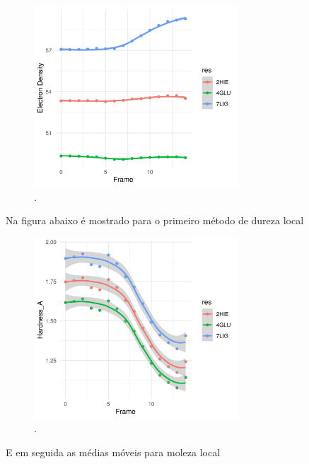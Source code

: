 \documentclass[a4paper,11pt]{refart}
\begin{document}
\hspace*{-\leftmarginwidth}
\begin{minipage}{\fullwidth}
	\begin{figure}[H]
		\begin{center}
			\includegraphics[width=3in]{images/tut6_img14}
			\caption{.}
			\label{fig_tut6_13}
		\end{center}
	\end{figure}
\end{minipage}

Na figura abaixo é mostrado para o primeiro método de dureza local 

\hspace*{-\leftmarginwidth}
\begin{minipage}{\fullwidth}
	\begin{figure}[H]
		\begin{center}
			\includegraphics[width=3in]{images/tut6_img15}
			\caption{.}
			\label{fig_tut6_14}
		\end{center}
	\end{figure}
\end{minipage}

E em seguida as médias móveis para moleza local
\end{document}
